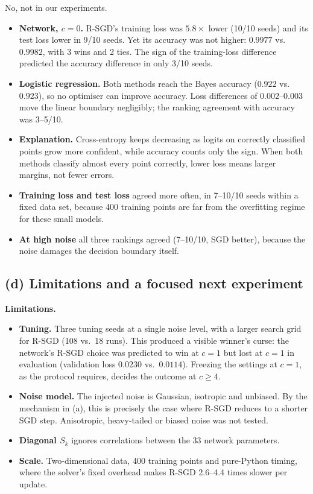 \documentclass[11pt,a4paper]{article}
\begin{document}
No, not in our experiments.
\begin{itemize}
\item \textbf{Network, $c=0$.} R-SGD's training loss was $5.8\times$ lower (10/10 seeds) and its
test loss lower in 9/10 seeds. Yet its accuracy was not higher: $0.9977$ vs.\ $0.9982$, with 3 wins
and 2 ties. The sign of the training-loss difference predicted the accuracy difference in only
3/10 seeds.
\item \textbf{Logistic regression.} Both methods reach the Bayes accuracy ($0.922$ vs.\ $0.923$),
so no optimiser can improve accuracy. Loss differences of $0.002$--$0.003$ move the linear boundary
negligibly; the ranking agreement with accuracy was 3--5/10.
\item \textbf{Explanation.} Cross-entropy keeps decreasing as logits on correctly classified points
grow more confident, while accuracy counts only the sign. When both methods classify almost every
point correctly, lower loss means larger margins, not fewer errors.
\item \textbf{Training loss and test loss} agreed more often, in 7--10/10 seeds within a fixed data
set, because 400 training points are far from the overfitting regime for these small models.
\item \textbf{At high noise} all three rankings agreed (7--10/10, SGD better), because the noise
damages the decision boundary itself.
\end{itemize}

\subsection{(d) Limitations and a focused next experiment}

\textbf{Limitations.}
\begin{itemize}
\item \textbf{Tuning.} Three tuning seeds at a single noise level, with a larger search grid for
R-SGD (108 vs.\ 18 runs). This produced a visible winner's curse: the network's R-SGD choice was
predicted to win at $c=1$ but lost at $c=1$ in evaluation (validation loss $0.0230$ vs.\
$0.0114$). Freezing the settings at $c=1$, as the protocol requires, decides the outcome at
$c\ge4$.
\item \textbf{Noise model.} The injected noise is Gaussian, isotropic and unbiased. By the mechanism
in (a), this is precisely the case where R-SGD reduces to a shorter SGD step. Anisotropic,
heavy-tailed or biased noise was not tested.
\item \textbf{Diagonal $S_k$} ignores correlations between the 33 network parameters.
\item \textbf{Scale.} Two-dimensional data, 400 training points and pure-Python timing, where the
solver's fixed overhead makes R-SGD 2.6--4.4 times slower per update.
\end{itemize}
\end{document}
